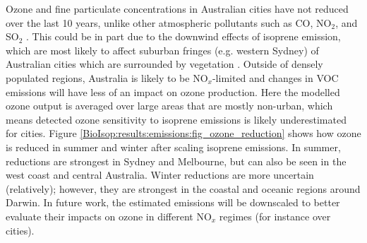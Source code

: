       
      
      Ozone and fine particulate concentrations in Australian cities have not reduced over the last 10 years, unlike other atmospheric pollutants such as CO, NO$_2$, and SO$_2$ \parencite{SOE2016}.
      This could be in part due to the downwind effects of isoprene emission, which are most likely to affect suburban fringes (e.g. western Sydney) of Australian cities which are surrounded by vegetation \parencite{Millet2016}.
      Outside of densely populated regions, Australia is likely to be NO$_x$-limited and changes in VOC emissions will have less of an impact on ozone production.
      Here the modelled ozone output is averaged over large areas that are mostly non-urban, which means detected ozone sensitivity to isoprene emissions is likely underestimated for cities.
      Figure \ref{BioIsop:results:emissions:fig_ozone_reduction} shows how ozone is reduced in summer and winter after scaling isoprene emissions.
      In summer, reductions are strongest in Sydney and Melbourne, but can also be seen in the west coast and central Australia.
      Winter reductions are more uncertain (relatively); however, they are strongest in the coastal and oceanic regions around Darwin.
      In future work, the estimated emissions will be downscaled to better evaluate their impacts on ozone in different NO$_x$ regimes (for instance over cities).
      
      
      

